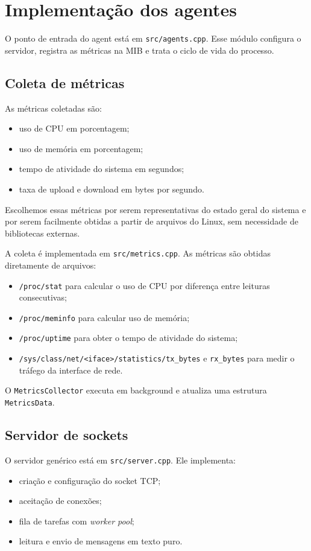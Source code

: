 \documentclass[12pt,a4paper]{article}
\begin{document}
\section{Implementação dos agentes}
O ponto de entrada do agent está em \texttt{src/agents.cpp}. Esse módulo configura o servidor, registra as métricas na MIB e trata o ciclo de vida do processo.

\subsection{Coleta de métricas}
As métricas coletadas são:
\begin{itemize}
    \item uso de CPU em porcentagem;
    \item uso de memória em porcentagem;
    \item tempo de atividade do sistema em segundos;
    \item taxa de upload e download em bytes por segundo.
\end{itemize}

Escolhemos essas métricas por serem representativas do estado geral do sistema e por serem facilmente obtidas a partir de arquivos do Linux, sem necessidade de bibliotecas externas.

A coleta é implementada em \texttt{src/metrics.cpp}. As métricas são obtidas diretamente de arquivos:
\begin{itemize}
	\item \texttt{/proc/stat} para calcular o uso de CPU por diferença entre leituras consecutivas;
	\item \texttt{/proc/meminfo} para calcular uso de memória;
	\item \texttt{/proc/uptime} para obter o tempo de atividade do sistema;
	\item \texttt{/sys/class/net/<iface>/statistics/tx\_bytes} e \texttt{rx\_bytes} para medir o tráfego da interface de rede.
\end{itemize}

O \texttt{MetricsCollector} executa em background e atualiza uma estrutura \texttt{MetricsData}.

\subsection{Servidor de sockets}
O servidor genérico está em \texttt{src/server.cpp}. Ele implementa:
\begin{itemize}
	\item criação e configuração do socket TCP;
	\item aceitação de conexões;
	\item fila de tarefas com \textit{worker pool};
	\item leitura e envio de mensagens em texto puro.
\end{itemize}
\end{document}
